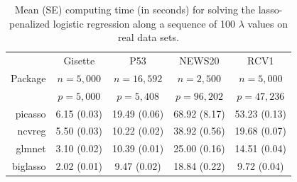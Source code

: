 \begin{table}[H] 
\centering
\begin{tabular}{r|cccc}
\toprule
 & Gisette & P53 & NEWS20 & RCV1 \\
Package & $n = 5,000$ & $n=16,592$ & $n=2,500$ & $n=5,000$ \\
 & $p = 5,000$ & $p=5,408$ & $p=96,202$ & $p=47,236$ \\
\midrule
picasso & 6.15 (0.03) & 19.49 (0.06) & 68.92 (8.17) & 53.23 (0.13)\\
ncvreg & 5.50 (0.03) & 10.22 (0.02) & 38.92 (0.56) & 19.68 (0.07) \\
glmnet & 3.10 (0.02) & 10.39 (0.01) &  25.00 (0.16) & 14.51 (0.04) \\
biglasso & 2.02 (0.01) & 9.47 (0.02) &  18.84 (0.22) & 9.72 (0.04) \\
\bottomrule
\end{tabular}
\caption{Mean (SE) computing time (in seconds) for solving the lasso-penalized logistic regression along a sequence of 100 $\lambda$ values on real data sets.}
\label{tab_real_res_log}
\end{table}


